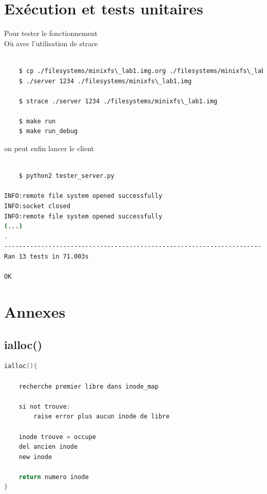 \documentclass[a4paper,12pt]{article}
\begin{document}
\section{Exécution et tests unitaires}

Pour tester le fonctionnement\\


Où avec l'utilisation de strace

\begin{lstlisting}[language=bash,caption={lancer le server}]

	$ cp ./filesystems/minixfs\_lab1.img.org ./filesystems/minixfs\_lab1.img
	$ ./server 1234 ./filesystems/minixfs\_lab1.img
	
	$ strace ./server 1234 ./filesystems/minixfs\_lab1.img

	$ make run
	$ make run_debug
\end{lstlisting}

on peut enfin lancer le client\\
\begin{lstlisting}[language=bash,caption={lancer le client}]
	
	$ python2 tester_server.py
  
INFO:remote file system opened successfully
INFO:socket closed
INFO:remote file system opened successfully
(...)
.
----------------------------------------------------------------------
Ran 13 tests in 71.003s

OK

\end{lstlisting}


\section{Annexes}

\subsection*{ialloc()}

\begin{lstlisting}[language=C, caption=pseudo code ialloc()()]
ialloc(){

	recherche premier libre dans inode_map
	
	si not trouve:
		raise error plus aucun inode de libre
	
	inode trouve = occupe
	del ancien inode
	new inode
	
	return numero inode
}
\end{lstlisting}
\end{document}
